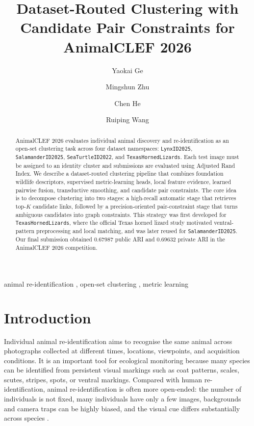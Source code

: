 \documentclass{ceurart}
\title{Dataset-Routed Clustering with Candidate Pair Constraints for AnimalCLEF 2026}
\author[1,2]{Yaokai Ge}[%
email=geyk886@163.com,
]
\author[1,2]{Mingshun Zhu}[%
email=22009200471@stu.xidian.edu.cn,
]
\author[1,2]{Chen He}[%
email=hechen@ict.ac.cn,
orcid=0000-0003-0124-8860,
]
\author[1,2]{Ruiping Wang}[%
email=wangruiping@ict.ac.cn,
orcid=0000-0003-1830-2595,
]
\newcommand{\dataset}[1]{\texttt{#1}}
\begin{document}
\begin{abstract}
AnimalCLEF 2026 evaluates individual animal discovery and re-identification as an open-set clustering task across four dataset namespaces: \dataset{LynxID2025}, \dataset{SalamanderID2025}, \dataset{SeaTurtleID2022}, and \dataset{TexasHornedLizards}. Each test image must be assigned to an identity cluster and submissions are evaluated using Adjusted Rand Index. We describe a dataset-routed clustering pipeline that combines foundation wildlife descriptors, supervised metric-learning heads, local feature evidence, learned pairwise fusion, transductive smoothing, and candidate pair constraints. The core idea is to decompose clustering into two stages: a high-recall automatic stage that retrieves top-$K$ candidate links, followed by a precision-oriented pair-constraint stage that turns ambiguous candidates into graph constraints. This strategy was first developed for \dataset{TexasHornedLizards}, where the official Texas horned lizard study motivated ventral-pattern preprocessing and local matching, and was later reused for \dataset{SalamanderID2025}. Our final submission obtained 0.67987 public ARI and 0.69632 private ARI in the AnimalCLEF 2026 competition.
\end{abstract}

\begin{keywords}
animal re-identification \sep
open-set clustering \sep
metric learning
\end{keywords}

\maketitle

\section{Introduction}
Individual animal re-identification aims to recognise the same animal across photographs collected at different times, locations, viewpoints, and acquisition conditions. It is an important tool for ecological monitoring because many species can be identified from persistent visual markings such as coat patterns, scales, scutes, stripes, spots, or ventral markings. Compared with human re-identification, animal re-identification is often more open-ended: the number of individuals is not fixed, many individuals have only a few images, backgrounds and camera traps can be highly biased, and the visual cue differs substantially across species \cite{schneider2019animalreid,wildlifedatasets}.
\end{document}
